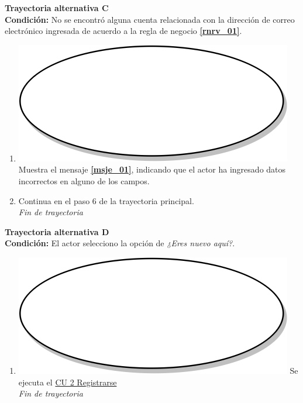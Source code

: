 \textbf{Trayectoria alternativa C} \label{cu1_1_ta_c}\\
\textbf{Condición:} No se encontró alguna cuenta relacionada con la dirección de correo electrónico ingresada de acuerdo a la regla de negocio \textbf{\ref{rnrv_01}}.\\
 \begin{enumerate}[label=C\arabic*]
    \item {\includegraphics[scale=.05]{Capitulo3/img/proceso.png} Muestra el mensaje \textbf{\ref{msje_01}}, indicando que el actor ha ingresado datos incorrectos en alguno de los campos.}
    \item {Continua en el paso 6 de la trayectoria principal.} \\
    \textit{Fin de trayectoria} \\
\end{enumerate}

\textbf{Trayectoria alternativa D} \label{cu1_1_ta_d}\\
\textbf{Condición:} El actor selecciono la opción de \textit{¿Eres nuevo aquí?}.\\
 \begin{enumerate}[label=D\arabic*]
    \item {\includegraphics[scale=.05]{Capitulo3/img/proceso.png} Se ejecuta el \hyperref[cu2]{CU 2 Registrarse}} \\
    \textit{Fin de trayectoria} \\
\end{enumerate}

